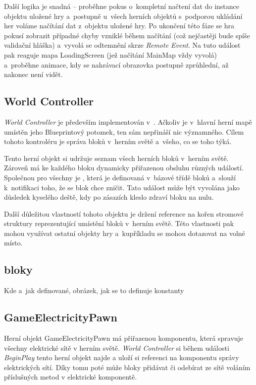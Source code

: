 Další logika je snadná -- proběhne pokus o~kompletní načtení dat do instance objektu uložené hry a~postupně u~všech herních objektů s~podporou ukládání her voláme načítání dat z~objektu uložené hry. Po ukončení této fáze se hra pokusí zobrazit případné chyby vzniklé během načítání (což nejčastěji bude spíše validační hláška) a~vyvolá se odtemnění skrze \textit{Remote Event}. Na tuto událost pak reaguje mapa LoadingScreen (jež načítání MainMap vždy vyvolá) a~proběhne animace, kdy se nahrávací obrazovka postupně zprůhlední, až nakonec není vidět.


\subsection{World Controller}

\textit{World Controller} je především implementován v~\CPP{}. Ačkoliv je v~hlavní herní mapě umístěn jeho Blueprintový potomek, ten sám nepřináší nic významného. Cílem tohoto kontroléru je správa bloků v~herním světě a~všeho, co se toho týká.

Tento herní objekt si udržuje seznam všech herních bloků v~herním světě. Zároveň má ke každého bloku dynamicky přiřazenou obsluhu různých událostí. Společnou pro všechny je , která je definovaná v~bázové třídě bloků a~slouží k~notifikaci toho, že se blok chce zničit. Tato událost může být vyvolána jako důsledek kyselého deště, kdy po zásazích kleslo zdraví bloku na nulu.

Další důležitou vlastností tohoto objektu je držení reference na kořen stromové struktury reprezentující umístění bloků v~herním světě. Této vlastnosti pak mohou využívat ostatní objekty hry a~kupříkladu se mohou dotazovat na volné místo.


\subsection{bloky}

Kde a~jak definované, obrázek, jak se to definuje konstanty


\subsection{GameElectricityPawn}

Herní objekt GameElectricityPawn má přiřazenou komponentu\linebreak {}, která spravuje všechny elektrické sítě v herním světě. \textit{World Controller} si během události \textit{BeginPlay} tento herní objekt najde a uloží si referenci na komponentu správy elektrických sítí. Díky tomu poté může bloky přidávat či odebírat ze sítě voláním příslušných metod v elektrické komponentě.


